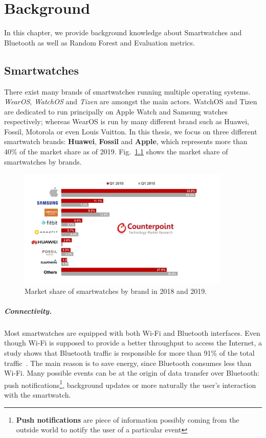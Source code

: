 \chapter{Background}
\label{chap:Background}
In this chapter, we provide background knowledge about Smartwatches and Bluetooth as well as Random Forest and Evaluation metrics.


\section{Smartwatches}
\label{sec:smartwatches}
There exist many brands of smartwatches running multiple operating systems. \textit{WearOS}, \textit{WatchOS} and \textit{Tizen} are amongst the main actors. WatchOS and Tizen are dedicated to run principally on Apple Watch and Samsung watches respectively; whereas WearOS is run by many different brand such as Huawei, Fossil, Motorola or even Louis Vuitton. In this thesis, we focus on three different smartwatch brands: \textbf{Huawei}, \textbf{Fossil} and \textbf{Apple}, which represents more than 40\% of the market share as of 2019. Fig.~\ref{fig:marketshare smartwatches.jpg} shows the market share of smartwatches by brands.


\begin{figure}[H]
 \centering
 \includegraphics[width=0.9\textwidth]{figures/marketshare smartwatches.jpg}
 \caption[test]{Market share of smartwatches by brand in 2018 and 2019.\footnotemark}
 \label{fig:marketshare smartwatches.jpg}
\end{figure}




\paragraph{Connectivity.} Most smartwatches are equipped with both Wi-Fi and Bluetooth interfaces. Even though Wi-Fi is supposed to provide a better throughput to access the Internet, a study shows that Bluetooth traffic is responsible for more than 91\% of the total traffic~\cite{10.1145/3081333.3081351}. The main reason is to save energy, since Bluetooth consumes less than Wi-Fi. Many possible events can be at the origin of data transfer over Bluetooth: push notifications\footnote{\textbf{Push notifications} are piece of information possibly coming from the outside world to notify the user of a particular event}, background updates or more naturally the user's interaction with the smartwatch.

